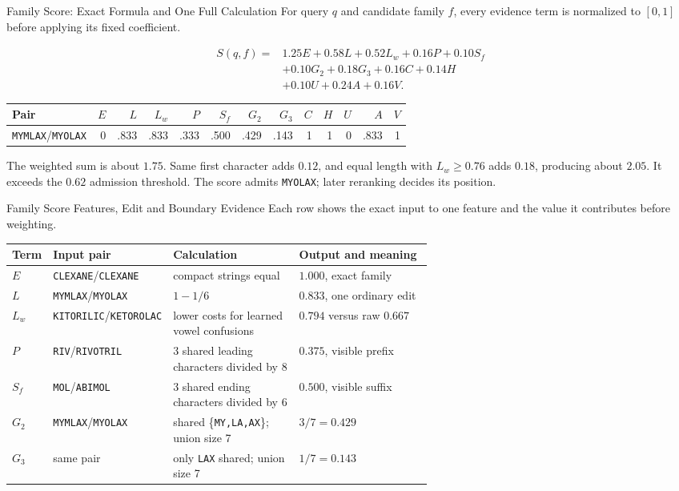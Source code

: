 \documentclass[aspectratio=169,10pt]{beamer}
\newcommand{\code}[1]{\texttt{#1}}
\begin{document}
\begin{frame}{Family Score: Exact Formula and One Full Calculation}
\footnotesize
For query $q$ and candidate family $f$, every evidence term is normalized to
$[0,1]$ before applying its fixed coefficient.

\begin{align*}
S(q,f)={}&1.25E + 0.58L + 0.52L_w + 0.16P + 0.10S_f\\
&+0.10G_2 + 0.18G_3 + 0.16C + 0.14H\\
&+0.10U + 0.24A + 0.16V.
\end{align*}

\begin{table}
\centering
\scriptsize
\begin{tabular}{@{}lrrrrrrrrrrrr@{}}
\toprule
\textbf{Pair} & $E$ & $L$ & $L_w$ & $P$ & $S_f$ & $G_2$ & $G_3$ & $C$ & $H$ & $U$ & $A$ & $V$ \\
\midrule
\code{MYMLAX}/\code{MYOLAX} & 0 & .833 & .833 & .333 & .500 & .429 & .143 & 1 & 1 & 0 & .833 & 1 \\
\bottomrule
\end{tabular}
\end{table}

\scriptsize
The weighted sum is about $1.75$. Same first character adds $0.12$, and equal
length with $L_w\geq0.76$ adds $0.18$, producing about $2.05$. It exceeds the
$0.62$ admission threshold. The score admits \code{MYOLAX}; later reranking
decides its position.
\end{frame}

\begin{frame}{Family Score Features, Edit and Boundary Evidence}
\scriptsize
Each row shows the exact input to one feature and the value it contributes
before weighting.

\begin{tabularx}{\linewidth}{@{}L{0.08\linewidth}L{0.23\linewidth}L{0.30\linewidth}Y@{}}
\toprule
\textbf{Term} & \textbf{Input pair} & \textbf{Calculation} & \textbf{Output and meaning} \\
\midrule
$E$ & \code{CLEXANE}/\code{CLEXANE} & compact strings equal & $1.000$, exact family \\
$L$ & \code{MYMLAX}/\code{MYOLAX} & $1-1/6$ & $0.833$, one ordinary edit \\
$L_w$ & \code{KITORILIC}/\code{KETOROLAC} & lower costs for learned vowel confusions & $0.794$ versus raw $0.667$ \\
$P$ & \code{RIV}/\code{RIVOTRIL} & 3 shared leading characters divided by 8 & $0.375$, visible prefix \\
$S_f$ & \code{MOL}/\code{ABIMOL} & 3 shared ending characters divided by 6 & $0.500$, visible suffix \\
$G_2$ & \code{MYMLAX}/\code{MYOLAX} & shared \{\code{MY,LA,AX}\}; union size 7 & $3/7=0.429$ \\
$G_3$ & same pair & only \code{LAX} shared; union size 7 & $1/7=0.143$ \\
\bottomrule
\end{tabularx}
\end{frame}
\end{document}
